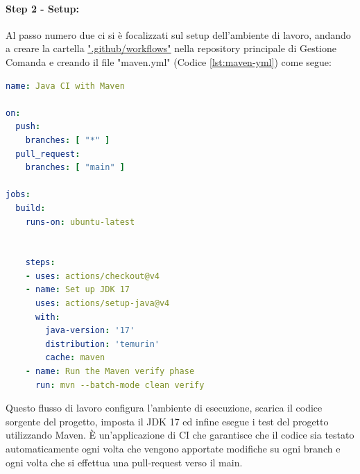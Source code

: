 \paragraph{Step 2 - Setup:}
Al passo numero due ci si è focalizzati sul setup dell’ambiente di lavoro, andando a creare la cartella \href{https://github.com/giorgio-hash/GestioneComanda/tree/main/.github/workflows}{".github/workflows"} nella repository principale di Gestione Comanda e creando il file "maven.yml" (Codice \vref{lst:maven-yml}) come segue:
\begin{lstlisting}[language=yaml, caption={Creazione del file maven.yml}, label=lst:maven-yml]
name: Java CI with Maven

on:
  push:
    branches: [ "*" ]
  pull_request:
    branches: [ "main" ]

jobs:
  build:
    runs-on: ubuntu-latest
    

    steps:
    - uses: actions/checkout@v4
    - name: Set up JDK 17
      uses: actions/setup-java@v4
      with:
        java-version: '17'
        distribution: 'temurin'
        cache: maven
    - name: Run the Maven verify phase
      run: mvn --batch-mode clean verify
\end{lstlisting}
Questo flusso di lavoro configura l'ambiente di esecuzione, scarica il codice sorgente del progetto, imposta il JDK 17 ed infine esegue i test del progetto utilizzando Maven. È un'applicazione di CI che garantisce che il codice sia testato automaticamente ogni volta che vengono apportate modifiche su ogni branch e ogni volta che si effettua una pull-request verso il main.
